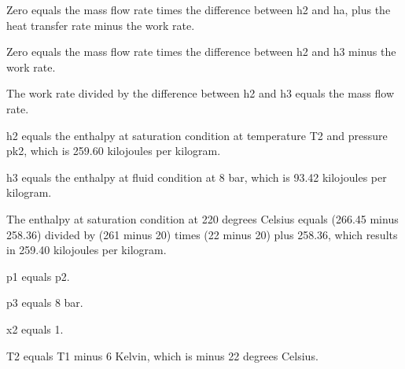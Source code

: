 Zero equals the mass flow rate times the difference between h2 and ha, plus the heat transfer rate minus the work rate.

Zero equals the mass flow rate times the difference between h2 and h3 minus the work rate.

The work rate divided by the difference between h2 and h3 equals the mass flow rate.

h2 equals the enthalpy at saturation condition at temperature T2 and pressure pk2, which is 259.60 kilojoules per kilogram.

h3 equals the enthalpy at fluid condition at 8 bar, which is 93.42 kilojoules per kilogram.

The enthalpy at saturation condition at 220 degrees Celsius equals (266.45 minus 258.36) divided by (261 minus 20) times (22 minus 20) plus 258.36, which results in 259.40 kilojoules per kilogram.

p1 equals p2.

p3 equals 8 bar.

x2 equals 1.

T2 equals T1 minus 6 Kelvin, which is minus 22 degrees Celsius.